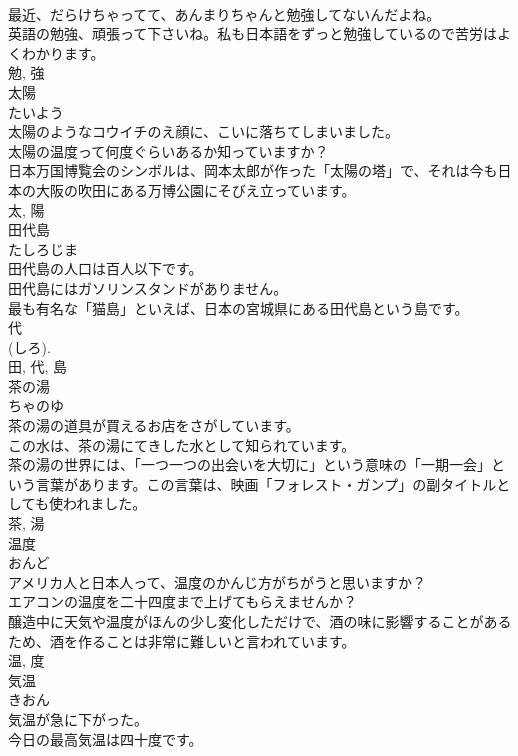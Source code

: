 \documentclass[8pt]{extreport}
\begin{document}
\begin{CJK}{UTF8}{min}
\\	最近、だらけちゃってて、あんまりちゃんと勉強してないんだよね。	
\\	英語の勉強、頑張って下さいね。私も日本語をずっと勉強しているので苦労はよくわかります。	
\\	勉, 強	
\\	太陽	
\\	たいよう	
\\	太陽のようなコウイチのえ顔に、こいに落ちてしまいました。	
\\	太陽の温度って何度ぐらいあるか知っていますか？	
\\	日本万国博覧会のシンボルは、岡本太郎が作った「太陽の塔」で、それは今も日本の大阪の吹田にある万博公園にそびえ立っています。	
\\	太, 陽	
\\	田代島	
\\	たしろじま	
\\	田代島の人口は百人以下です。	
\\	田代島にはガソリンスタンドがありません。	
\\	最も有名な「猫島」といえば、日本の宮城県にある田代島という島です。	
\\	代 
\\	(しろ). 
\\	田, 代, 島	
\\	茶の湯	
\\	ちゃのゆ	
\\	茶の湯の道具が買えるお店をさがしています。	
\\	この水は、茶の湯にてきした水として知られています。	
\\	茶の湯の世界には、「一つ一つの出会いを大切に」という意味の「一期一会」という言葉があります。この言葉は、映画「フォレスト・ガンプ」の副タイトルとしても使われました。	
\\	茶, 湯	
\\	温度	
\\	おんど	
\\	アメリカ人と日本人って、温度のかんじ方がちがうと思いますか？	
\\	エアコンの温度を二十四度まで上げてもらえませんか？	
\\	醸造中に天気や温度がほんの少し変化しただけで、酒の味に影響することがあるため、酒を作ることは非常に難しいと言われています。	
\\	温, 度	
\\	気温	
\\	きおん	
\\	気温が急に下がった。	
\\	今日の最高気温は四十度です。	

\end{CJK}
\end{document}
